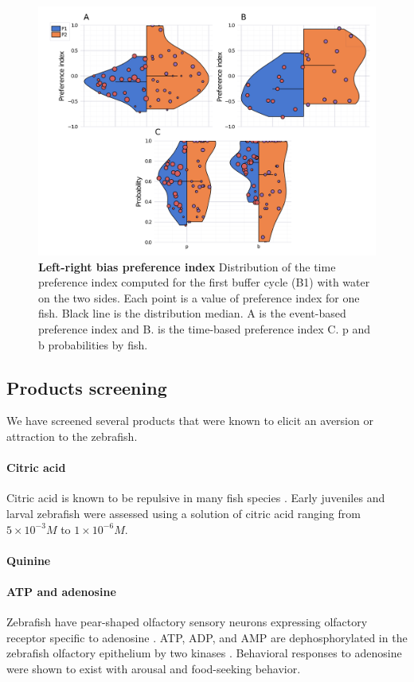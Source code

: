     \begin{figure}[h]
      \centering
      \includegraphics[width=1\textwidth]{part_2/assets/dye_pi.png}
      \caption{\textbf{Left-right bias preference index} Distribution of the time preference index computed for the first buffer cycle (B1) with water on the two sides. Each point is a value of preference index for one fish. Black line is the distribution median. A is the event-based preference index and B. is the time-based preference index C. p and b probabilities by fish.}
      \label{dye_bias}
    \end{figure}

  \subsection{Products screening}
  We have screened several products that were known to elicit an aversion or attraction to the zebrafish.

  \paragraph{Citric acid}
  Citric acid is known to be repulsive in many fish species \cite{}. Early juveniles and larval zebrafish were assessed using a solution of citric acid ranging from $5 \times 10^{-3} M$ to $1 \times 10^{-6} M$.

  \paragraph{Quinine}


  \paragraph{ATP and adenosine}
  Zebrafish have pear-shaped olfactory sensory neurons expressing olfactory receptor specific to adenosine \cite{}. ATP, ADP, and AMP are dephosphorylated in the zebrafish olfactory epithelium by two kinases \cite{}. Behavioral responses to adenosine were shown to exist with arousal and food-seeking behavior.

